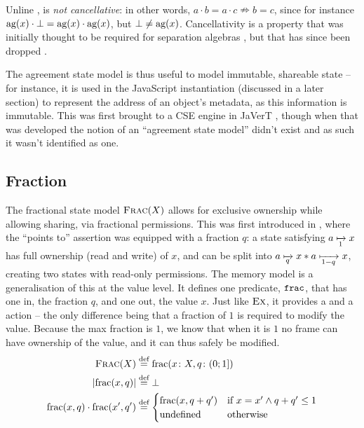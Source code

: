 Unline \Ex, \Ag{} is \emph{not cancellative}: in other words, $a\cdot b = a\cdot c \nRightarrow b=c$, since for instance $\text{ag}(x) \cdot \bot=\text{ag}(x)\cdot\text{ag}(x)$, but $\bot\neq\text{ag}(x)$. Cancellativity is a property that was initially thought to be required for separation algebras \cite{abstractseplogic,sepalgebra}, but that has since been dropped \cite{statesoundness,iris}.

The agreement state model is thus useful to model immutable, shareable state -- for instance, it is used in the JavaScript instantiation (discussed in a later section) to represent the address of an object's metadata, as this information is immutable. This was first brought to a CSE engine in JaVerT \cite{javert1,javert2}, though when that was developed the notion of an ``agreement state model'' didn't exist and as such it wasn't identified as one.

\subsection{Fraction}

The fractional state model $\textsc{Frac}(X)$ allows for exclusive ownership while allowing sharing, via fractional permissions. This was first introduced in \cite{fracpermissions,fracpermissions2}, where the ``points to'' assertion was equipped with a fraction $q$: a state satisfying $a\mapstoq{1}x$ has full ownership (read and write) of $x$, and can be split into $a\mapstoq{q}x * a\mapstoq{1-q}x$, creating two states with read-only permissions. The \Frac{} memory model is a generalisation of this at the value level. It defines one predicate, $\texttt{frac}$, that has one in, the fraction $q$, and one out, the value $x$. Just like $\textsc{Ex}$, it provides a \load{} and a \store{} action -- the only difference being that a fraction of $1$ is required to modify the value. Because the max fraction is $1$, we know that when it is $1$ no frame can have ownership of the value, and it can thus safely be modified.
\begin{align*}
	\textsc{Frac}(X)&\stackrel{\textnormal{def}}= \text{frac}(x\colon X, q\colon (0;1])\\
	|\text{frac}(x, q)| &\stackrel{\textnormal{def}}= \bot\\
	\text{frac}(x,q)\cdot\text{frac}(x',q')&\stackrel{\textnormal{def}}= \begin{cases}
		\text{frac}(x,q+q') & \text{if}~ x=x' \land q+q' \leq 1\\
		\text{undefined} &\text{otherwise}
	\end{cases}
\end{align*}

